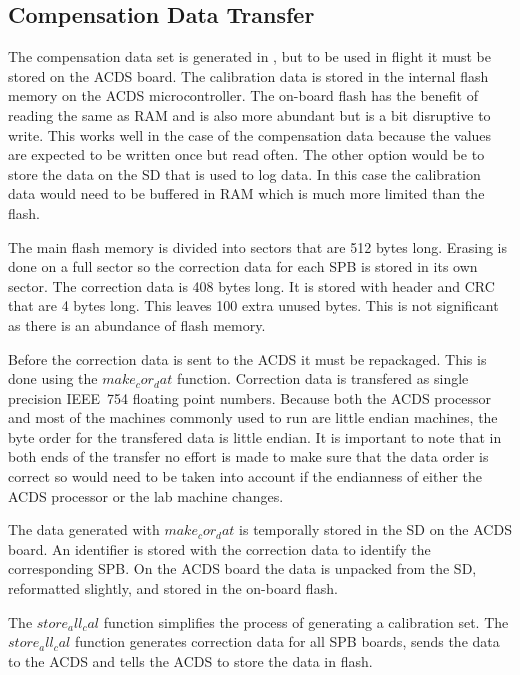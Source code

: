 \subsection{Compensation Data Transfer}

The compensation data set is generated in \matlab, but to be used in flight it must be stored on the \ac{ACDS} board. The calibration data is stored in the internal flash memory on the \ac{ACDS} microcontroller. The on-board flash has the benefit of reading the same as \ac{RAM} and is also more abundant but is a bit disruptive to write. This works well in the case of the compensation data because the values are expected to be written once but read often. The other option would be to store the data on the \ac{SD} that is used to log data. In this case the calibration data would need to be buffered in \ac{RAM} which is much more limited than the flash. 

The main flash memory is divided into sectors that are 512 bytes long. Erasing is done on a full sector so the correction data for each \ac{SPB} is stored in its own sector. The correction data is 408 bytes long. It is stored with header and \ac{CRC} that are 4 bytes long. This leaves 100 extra unused bytes. This is not significant as there is an abundance of flash memory.

Before the correction data is sent to the \ac{ACDS} it must be repackaged. This is done using the \lstMat$make_cor_dat$ function. Correction data is transfered as single precision IEEE~754 floating point numbers. Because both the \ac{ACDS} processor and most of the machines commonly used to run \matlab are little endian machines, the byte order for the transfered data is little endian. It is important to note that in both ends of the transfer no effort is made to make sure that the data order is correct so would need to be taken into account if the endianness of either the \ac{ACDS} processor or the lab machine changes.

The data generated with \lstMat$make_cor_dat$ is temporally stored in the \ac{SD} on the \ac{ACDS} board. An identifier is stored with the correction data to identify the corresponding \ac{SPB}. On the \ac{ACDS} board the data is unpacked from the \ac{SD}, reformatted slightly, and stored in the on-board flash. 

The \lstMat$store_all_cal$ function simplifies the process of generating a calibration set. The \lstMat$store_all_cal$ function generates correction data for all \ac{SPB} boards, sends the data to the \ac{ACDS} and tells the \ac{ACDS} to store the data in flash. 

